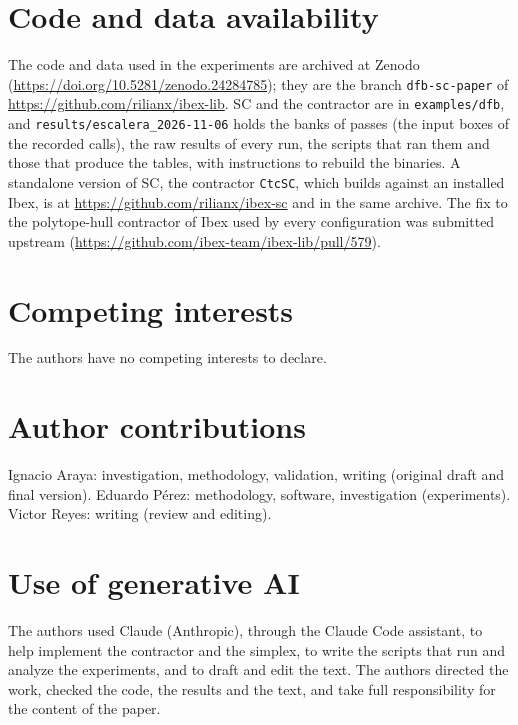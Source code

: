 \documentclass[11pt]{article}
\theoremstyle{definition}
\theoremstyle{remark}
\begin{document}
\section*{Code and data availability}
The code and data used in the experiments are archived at Zenodo
(\url{https://doi.org/10.5281/zenodo.24284785}); they are the branch
\texttt{dfb-sc-paper} of \url{https://github.com/rilianx/ibex-lib}. SC and the
contractor are in \texttt{examples/dfb}, and
\texttt{results/escalera\_2026-11-06} holds the banks of passes (the input
boxes of the recorded calls), the raw results of every run, the scripts that
ran them and those that produce the tables, with instructions to rebuild the
binaries. A standalone version of SC, the contractor \texttt{CtcSC}, which
builds against an installed Ibex, is at \url{https://github.com/rilianx/ibex-sc}
and in the same archive. The fix to the polytope-hull contractor of Ibex used by
every configuration was submitted upstream
(\url{https://github.com/ibex-team/ibex-lib/pull/579}).

\section*{Competing interests}
The authors have no competing interests to declare.

\section*{Author contributions}
Ignacio Araya: investigation, methodology, validation, writing (original draft
and final version). Eduardo P\'erez: methodology, software, investigation
(experiments). Victor Reyes: writing (review and editing).

\section*{Use of generative AI}
The authors used Claude (Anthropic), through the Claude Code assistant, to
help implement the contractor and the simplex, to write the scripts that run
and analyze the experiments, and to draft and edit the text. The authors
directed the work, checked the code, the results and the text, and take full
responsibility for the content of the paper.



\end{document}
